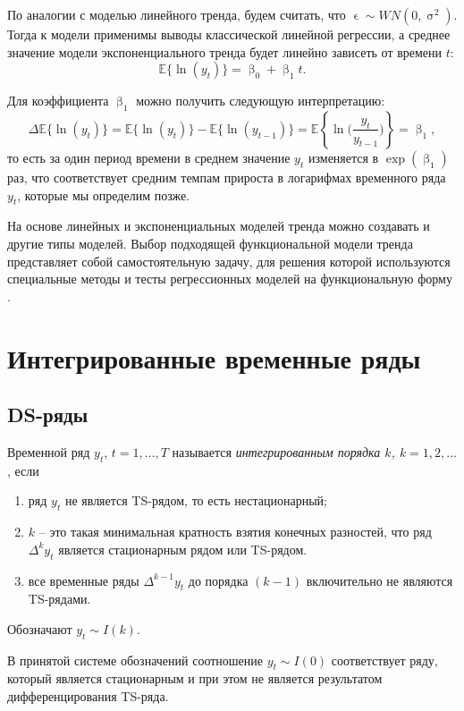 \documentclass[a4paper, 14pt]{extreport}
\numberwithin{equation}{section}
\renewcommand{\beta}{\upbeta}
\renewcommand{\epsilon}{\upvarepsilon}
\renewcommand{\sigma}{\upsigma}
\newcommand{\E}{\mathbb E}
\numberwithin{equation}{section}
\begin{document}
	По аналогии с моделью линейного тренда, будем считать, что $\epsilon \sim WN(0, \sigma^2)$. Тогда к модели применимы выводы классической линейной регрессии,
	а среднее значение модели экспоненциального тренда будет линейно зависеть от времени $t$:
	\begin{equation}
		\E \{\ln (y_t)\}=\beta_0+\beta_1t.
	\end{equation}
	
	Для коэффициента $\beta_1$ можно получить следующую интерпретацию:
	\begin{equation}
		\Delta \E\{\ln(y_t)\}=\E\{\ln(y_t)\}-\E\{\ln(y_{t-1})\}=\E\left\{\ln\bigg(\dfrac{y_t}{y_{t-1}}\bigg)\right\}=\beta_1,
	\end{equation}
	то есть за один период времени в среднем значение $y_t$ изменяется в $\exp(\beta_1)$ раз, что соответствует средним темпам прироста в логарифмах временного ряда $y_t$, которые мы определим позже.
	
	На основе линейных и экспоненциальных моделей тренда можно создавать и другие типы моделей.
	Выбор подходящей функциональной модели тренда представляет собой самостоятельную задачу, для решения которой используются специальные методы и тесты регрессионных моделей на функциональную форму \cite{10}.
	
	\section{Интегрированные временные ряды}
	\subsection{DS-ряды}
	Временной ряд $y_t$, $t=1,\ldots, T$ называется \textit{интегрированным порядка $k$, $k=1,2,\ldots$}, если
	\begin{enumerate}
		\item ряд $y_t$ не является TS-рядом, то есть нестационарный;
		\item $k$ -- это такая минимальная кратность взятия конечных разностей, что ряд $\Delta^ky_t$ является стационарным рядом или TS-рядом.
		\item все временные ряды $\Delta ^{k-1}y_t$ до порядка $(k-1)$ включительно не являются TS-рядами.
	\end{enumerate}
	Обозначают $y_t \sim I(k)$.
	
	В принятой системе обозначений соотношение $y_t\sim I(0)$ соответствует
	ряду, который является стационарным и при этом не является результатом
	дифференцирования TS-ряда.
	
\end{document}
